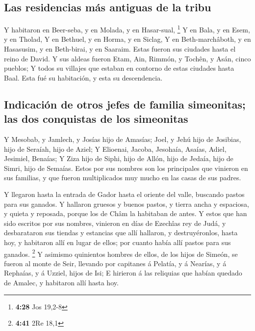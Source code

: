 \hypertarget{las-residencias-muxe1s-antiguas-de-la-tribu}{%
\subsection{Las residencias más antiguas de la
tribu}\label{las-residencias-muxe1s-antiguas-de-la-tribu}}

 Y habitaron en Beer-seba, y en Molada, y en Hasar-sual,
\footnote{\textbf{4:28} Jos 19,2-8}  Y en Bala, y en
Esem, y en Tholad,  Y en Bethuel, y en Horma, y en
Siclag,  Y en Beth-marchâboth, y en Hasasusim, y en
Beth-birai, y en Saaraim. Estas fueron sus ciudades hasta el reino de
David.  Y sus aldeas fueron Etam, Ain, Rimmón, y Tochên,
y Asán, cinco pueblos;  Y todos su villajes que estaban
en contorno de estas ciudades hasta Baal. Esta fué su habitación, y esta
su descendencia.

\hypertarget{indicaciuxf3n-de-otros-jefes-de-familia-simeonitas-las-dos-conquistas-de-los-simeonitas}{%
\subsection{Indicación de otros jefes de familia simeonitas; las dos
conquistas de los
simeonitas}\label{indicaciuxf3n-de-otros-jefes-de-familia-simeonitas-las-dos-conquistas-de-los-simeonitas}}

 Y Mesobab, y Jamlech, y Josías hijo de Amasías;
 Joel, y Jehú hijo de Josibias, hijo de Seraíah, hijo de
Aziel;  Y Elioenai, Jacoba, Jesohaía, Asaías, Adiel,
Jesimiel, Benaías;  Y Ziza hijo de Siphi, hijo de Allón,
hijo de Jedaía, hijo de Simri, hijo de Semaías.  Estos
por sus nombres son los principales que vinieron en sus familias, y que
fueron multiplicados muy mucho en las casas de sus padres.

 Y llegaron hasta la entrada de Gador hasta el oriente
del valle, buscando pastos para sus ganados.  Y hallaron
gruesos y buenos pastos, y tierra ancha y espaciosa, y quieta y
reposada, porque los de Châm la habitaban de antes.  Y
estos que han sido escritos por sus nombres, vinieron en días de
Ezechîas rey de Judá, y desbarataron sus tiendas y estancias que allí
hallaron, y destruyéronlos, hasta hoy, y habitaron allí en lugar de
ellos; por cuanto había allí pastos para sus ganados. \footnote{\textbf{4:41}
  2Re 18,1}  Y asimismo quinientos hombres de ellos, de
los hijos de Simeón, se fueron al monte de Seir, llevando por capitanes
á Pelatía, y á Nearías, y á Rephaías, y á Uzziel, hijos de Isi;
 E hirieron á las reliquias que habían quedado de Amalec,
y habitaron allí hasta hoy.

